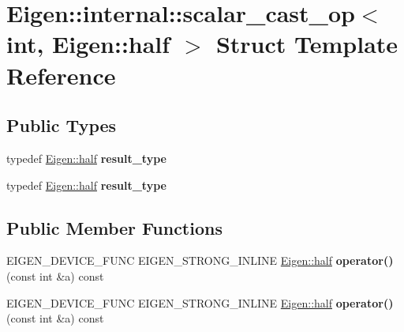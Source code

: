\hypertarget{struct_eigen_1_1internal_1_1scalar__cast__op_3_01int_00_01_eigen_1_1half_01_4}{}\section{Eigen\+:\+:internal\+:\+:scalar\+\_\+cast\+\_\+op$<$ int, Eigen\+:\+:half $>$ Struct Template Reference}
\label{struct_eigen_1_1internal_1_1scalar__cast__op_3_01int_00_01_eigen_1_1half_01_4}
\subsection*{Public Types}
\begin{DoxyCompactItemize}
\item 
\mbox{\label{struct_eigen_1_1internal_1_1scalar__cast__op_3_01int_00_01_eigen_1_1half_01_4_a3ab1f01b98ad0326ee17152f3071696e}} 
typedef \hyperlink{struct_eigen_1_1half}{Eigen\+::half} {\bfseries result\+\_\+type}
\item 
\mbox{\label{struct_eigen_1_1internal_1_1scalar__cast__op_3_01int_00_01_eigen_1_1half_01_4_a3ab1f01b98ad0326ee17152f3071696e}} 
typedef \hyperlink{struct_eigen_1_1half}{Eigen\+::half} {\bfseries result\+\_\+type}
\end{DoxyCompactItemize}
\subsection*{Public Member Functions}
\begin{DoxyCompactItemize}
\item 
\mbox{\label{struct_eigen_1_1internal_1_1scalar__cast__op_3_01int_00_01_eigen_1_1half_01_4_a6526f3eb5bc13ebeb3c19bf764f55497}} 
E\+I\+G\+E\+N\+\_\+\+D\+E\+V\+I\+C\+E\+\_\+\+F\+U\+NC E\+I\+G\+E\+N\+\_\+\+S\+T\+R\+O\+N\+G\+\_\+\+I\+N\+L\+I\+NE \hyperlink{struct_eigen_1_1half}{Eigen\+::half} {\bfseries operator()} (const int \&a) const
\item 
\mbox{\label{struct_eigen_1_1internal_1_1scalar__cast__op_3_01int_00_01_eigen_1_1half_01_4_a6526f3eb5bc13ebeb3c19bf764f55497}} 
E\+I\+G\+E\+N\+\_\+\+D\+E\+V\+I\+C\+E\+\_\+\+F\+U\+NC E\+I\+G\+E\+N\+\_\+\+S\+T\+R\+O\+N\+G\+\_\+\+I\+N\+L\+I\+NE \hyperlink{struct_eigen_1_1half}{Eigen\+::half} {\bfseries operator()} (const int \&a) const
\end{DoxyCompactItemize}


